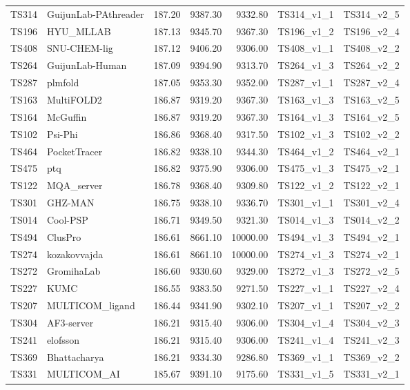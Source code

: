 \begin{table}[ht]
{\begin{tabular}{llrrrll}
TS314 & GuijunLab-PAthreader & 187.20 & 9387.30 & 9332.80 & TS314\_v1\_1 & TS314\_v2\_5 \\ 
TS196 & HYU\_MLLAB & 187.13 & 9345.70 & 9367.30 & TS196\_v1\_2 & TS196\_v2\_4 \\ 
TS408 & SNU-CHEM-lig & 187.12 & 9406.20 & 9306.00 & TS408\_v1\_1 & TS408\_v2\_2 \\ 
TS264 & GuijunLab-Human & 187.09 & 9394.90 & 9313.70 & TS264\_v1\_3 & TS264\_v2\_2 \\ 
TS287 & plmfold & 187.05 & 9353.30 & 9352.00 & TS287\_v1\_1 & TS287\_v2\_4 \\ 
TS163 & MultiFOLD2 & 186.87 & 9319.20 & 9367.30 & TS163\_v1\_3 & TS163\_v2\_5 \\ 
TS164 & McGuffin & 186.87 & 9319.20 & 9367.30 & TS164\_v1\_3 & TS164\_v2\_5 \\ 
TS102 & Psi-Phi & 186.86 & 9368.40 & 9317.50 & TS102\_v1\_3 & TS102\_v2\_2 \\ 
TS464 & PocketTracer & 186.82 & 9338.10 & 9344.30 & TS464\_v1\_2 & TS464\_v2\_1 \\ 
TS475 & ptq & 186.82 & 9375.90 & 9306.00 & TS475\_v1\_3 & TS475\_v2\_1 \\ 
TS122 & MQA\_server & 186.78 & 9368.40 & 9309.80 & TS122\_v1\_2 & TS122\_v2\_1 \\ 
TS301 & GHZ-MAN & 186.75 & 9338.10 & 9336.70 & TS301\_v1\_1 & TS301\_v2\_4 \\ 
TS014 & Cool-PSP & 186.71 & 9349.50 & 9321.30 & TS014\_v1\_3 & TS014\_v2\_2 \\ 
TS494 & ClusPro & 186.61 & 8661.10 & 10000.00 & TS494\_v1\_3 & TS494\_v2\_1 \\ 
TS274 & kozakovvajda & 186.61 & 8661.10 & 10000.00 & TS274\_v1\_3 & TS274\_v2\_1 \\ 
TS272 & GromihaLab & 186.60 & 9330.60 & 9329.00 & TS272\_v1\_3 & TS272\_v2\_5 \\ 
TS227 & KUMC & 186.55 & 9383.50 & 9271.50 & TS227\_v1\_1 & TS227\_v2\_4 \\ 
TS207 & MULTICOM\_ligand & 186.44 & 9341.90 & 9302.10 & TS207\_v1\_1 & TS207\_v2\_2 \\ 
TS304 & AF3-server & 186.21 & 9315.40 & 9306.00 & TS304\_v1\_4 & TS304\_v2\_3 \\ 
TS241 & elofsson & 186.21 & 9315.40 & 9306.00 & TS241\_v1\_4 & TS241\_v2\_3 \\ 
TS369 & Bhattacharya & 186.21 & 9334.30 & 9286.80 & TS369\_v1\_1 & TS369\_v2\_2 \\ 
TS331 & MULTICOM\_AI & 185.67 & 9391.10 & 9175.60 & TS331\_v1\_5 & TS331\_v2\_1 \\ 

\end{tabular}}
\end{table}
